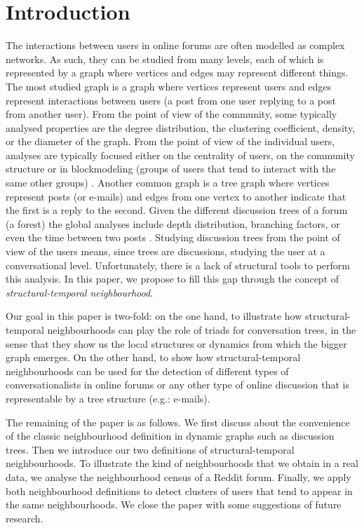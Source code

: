 \documentclass[conference]{IEEEtran}
\begin{document}
\section{Introduction}
The interactions between users in online forums are often modelled as complex networks. As such, they can be studied from many levels, each of which is represented by a graph where vertices and edges may represent different things. The most studied graph is a graph where vertices represent users and edges represent interactions between users (a post from one user replying to a post from another user). From the point of view of the community, some typically analysed properties are the degree distribution, the clustering coefficient, density, or the diameter of the graph. From the point of view of the individual users, analyses are typically focused either on the centrality of users, on the community structure or in blockmodeling (groups of users that tend to interact with the same other groups) \cite{McCallum2007a}. Another common graph is a tree graph where vertices represent posts (or e-mails) and edges from one vertex to another indicate that the first is a reply to the second. Given the different discussion trees of a forum (a forest) the global analyses include depth distribution, branching factors, or even the time between two posts \cite{Bhatt2012}. Studying discussion trees from the point of view of the users means, since trees are discussions, studying the user at a conversational level. Unfortunately, there is a lack of structural tools to perform this analysis. In this paper, we propose to fill this gap through the concept of \textit{structural-temporal neighbourhood}.  

Our goal in this paper is two-fold: on the one hand, to illustrate how structural-temporal neighbourhoods can play the role of triads for conversation trees, in the sense that they show us the local structures or dynamics from which the bigger graph emerges. On the other hand, to show how structural-temporal neighbourhoods can be used for the detection of different types of conversationalists in online forums or any other type of online discussion that is representable by a tree structure (e.g.: e-mails).

The remaining of the paper is as follows. We first discuss about the convenience of the classic neighbourhood definition in dynamic graphs such as discussion trees. Then we introduce our two definitions of structural-temporal neighbourhoods. To illustrate the kind of neighbourhoods that we obtain in a real data, we analyse the neighbourhood census of a Reddit forum. Finally, we apply both neighbourhood definitions to detect clusters of users that tend to appear in the same neighbourhoods. We close the paper with some suggestions of future research.
\end{document}
